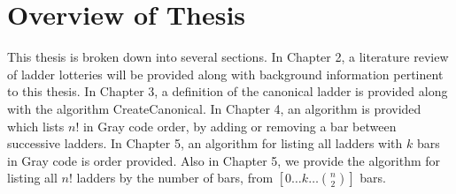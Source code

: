 \section{Overview of Thesis}
This thesis is broken down into several sections. In Chapter 2, a literature
review of ladder lotteries will be provided along with background information pertinent to this thesis. 
In Chapter 3, a definition of the canonical ladder is provided 
along with the algorithm {\sc CreateCanonical}. 
In Chapter 4, an algorithm is provided which lists $n!$ in Gray code order, by adding or removing a bar between 
successive ladders. In Chapter 5, an algorithm for listing all ladders with $k$ bars in Gray code is order provided. 
Also in Chapter 5, we provide the algorithm for listing all $n!$ ladders by the number of bars, from $[0 \dots k \dots{n \choose 2}]$ bars. 